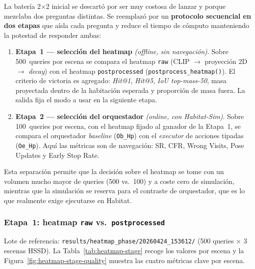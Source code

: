 \documentclass[11pt,a4paper]{article}
\begin{document}
La batería 2$\times$2 inicial se descartó por ser muy costosa de lanzar y
porque mezclaba dos preguntas distintas. Se reemplazó por un \textbf{protocolo
secuencial en dos etapas} que aísla cada pregunta y reduce el tiempo de
cómputo manteniendo la potestad de responder ambas:

\begin{enumerate}
  \item \textbf{Etapa~1 --- selección del heatmap} \emph{(offline, sin
        navegación)}. Sobre 500~queries por escena se compara el heatmap
        \texttt{raw} (CLIP $\rightarrow$ proyección 2D $\rightarrow$
        \emph{decay}) con el heatmap \texttt{postprocessed}
        (\texttt{postprocess\_heatmap()}). El criterio de victoria es
        agregado: \emph{Hit@1}, \emph{Hit@5}, \emph{IoU top-mass-50},
        masa proyectada dentro de la habitación esperada y proporción de
        masa fuera. La salida fija el modo a usar en la siguiente etapa.
  \item \textbf{Etapa~2 --- selección del orquestador} \emph{(online, con
        Habitat-Sim)}. Sobre 100~queries por escena, con el heatmap fijado
        al ganador de la Etapa~1, se compara el orquestador \emph{baseline}
        (\texttt{Ob\_Hp}) con el \emph{executor} de acciones tipadas
        (\texttt{Oe\_Hp}). Aquí las métricas son de navegación: SR, CFR,
        Wrong Visits, Pose Updates y Early Stop Rate.
\end{enumerate}

Esta separación permite que la decisión sobre el heatmap se tome con un
volumen mucho mayor de queries (500 vs.\ 100) y a coste cero de simulación,
mientras que la simulación se reserva para el contraste de orquestador, que
es lo que realmente exige ejecutarse en Habitat.

\subsubsection*{Etapa~1: heatmap \texttt{raw} vs.\ \texttt{postprocessed}}

Lote de referencia: \texttt{results/heatmap\_phase/20260424\_153612/}
(500 queries $\times$ 3 escenas HSSD). La Tabla~\ref{tab:heatmap-stage}
recoge los valores por escena y la Figura~\ref{fig:heatmap-stage-quality}
muestra las cuatro métricas clave por escena.
\end{document}
